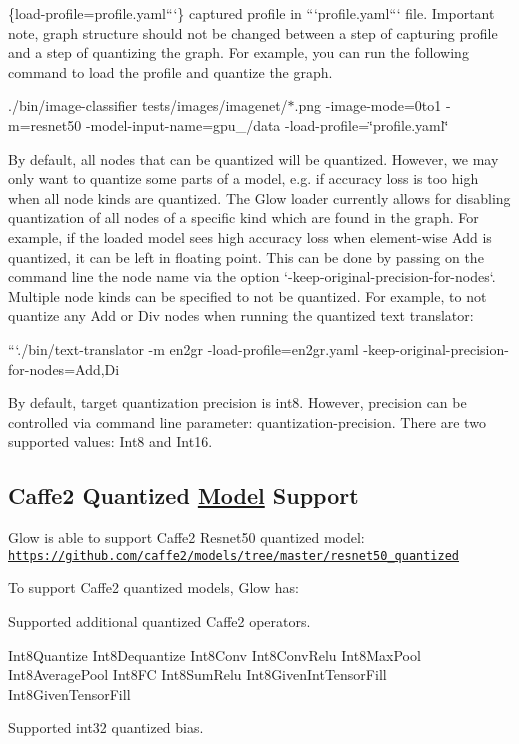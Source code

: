 \begin{DoxyCode}
\{load-profile=profile.yaml```\}
captured profile in ```profile.yaml``` file. Important note, graph structure
should not be changed between a step of capturing profile and a step of quantizing
the graph.
For example, you can run the following command to load the profile and quantize
the graph.
\end{DoxyCode}
 ./bin/image-\/classifier tests/images/imagenet/$\ast$.png -\/image-\/mode=0to1 -\/m=resnet50 -\/model-\/input-\/name=gpu\+\_/data -\/load-\/profile=\char`\"{}profile.\+yaml\char`\"{} 
\begin{DoxyCode}
By default, all nodes that can be quantized will be quantized. However, we may
only want to quantize some parts of a model, e.g. if accuracy loss is too high
when all node kinds are quantized. The Glow loader currently allows for
disabling quantization of all nodes of a specific kind which are found in the
graph. For example, if the loaded model sees high accuracy loss when
element-wise Add is quantized, it can be left in floating point. This can be
done by passing on the command line the node name via the option
`-keep-original-precision-for-nodes`. Multiple node kinds can be specified to
not be quantized. For example, to not quantize any Add or Div nodes when running
the quantized text translator:

```./bin/text-translator -m en2gr -load-profile=en2gr.yaml -keep-original-precision-for-nodes=Add,Di
\end{DoxyCode}


By default, target quantization precision is int8. However, precision can be controlled via command line parameter\+: {\ttfamily quantization-\/precision}. There are two supported values\+: {\ttfamily Int8} and {\ttfamily Int16}.

\subsection*{Caffe2 Quantized \hyperlink{struct_model}{Model} Support}

Glow is able to support Caffe2 Resnet50 quantized model\+: \href{https://github.com/caffe2/models/tree/master/resnet50_quantized}{\tt https\+://github.\+com/caffe2/models/tree/master/resnet50\+\_\+quantized}

To support Caffe2 quantized models, Glow has\+:
\begin{DoxyItemize}
\item Supported additional quantized Caffe2 operators. 
\begin{DoxyCode}
Int8Quantize
Int8Dequantize
Int8Conv
Int8ConvRelu
Int8MaxPool
Int8AveragePool
Int8FC
Int8SumRelu
Int8GivenIntTensorFill
Int8GivenTensorFill
\end{DoxyCode}

\item Supported int32 quantized bias.
\end{DoxyItemize}

